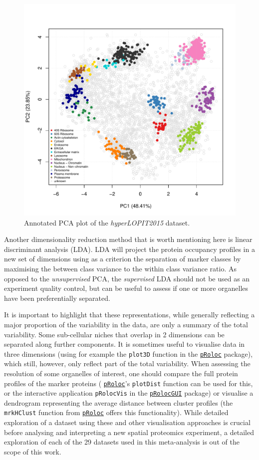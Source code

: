 \documentclass[12pt]{article}\usepackage[]{graphicx}\usepackage[]{color}
\newenvironment{knitrout}{}{} %
\newcommand{\Rpackage}[1]{\texttt{#1}}
\newcommand\Biocpkg[1]{%
  {\href{http://bioconductor.org/packages/#1}%
    {\Rpackage{#1}}}}
\begin{document}
\begin{figure}[ht]
  \centering
\begin{knitrout}
\color{fgcolor}
\includegraphics[width=0.75\linewidth]{figure/pcahl-1} 

\end{knitrout}
  \caption{Annotated PCA plot of the \textit{hyperLOPIT2015} dataset.}
  \label{fig:pcahl}
\end{figure}

Another dimensionality reduction method that is worth mentioning here
is linear discriminant analysis (LDA). LDA will project the protein
occupancy profiles in a new set of dimensions using as a criterion the
separation of marker classes by maximising the between class variance
to the within class variance ratio. As opposed to the
\textit{unsupervised} PCA, the \textit{supervised} LDA should not be
used as an experiment quality control, but can be useful to assess if
one or more organelles have been preferentially separated.

\bigskip

It is important to highlight that these representations, while
generally reflecting a major proportion of the variability in the
data, are only a summary of the total variability. Some sub-cellular
niches that overlap in 2 dimensions can be separated along further
components. It is sometimes useful to visualise data in three
dimensions (using for example the \texttt{plot3D} function in the
\Biocpkg{pRoloc} package), which still, however, only reflect part of
the total variability. When assessing the resolution of some
organelles of interest, one should compare the full protein profiles
of the marker proteins (\Biocpkg{pRoloc}'s \texttt{plotDist} function
can be used for this, or the interactive application
\texttt{pRolocVis} in the \Biocpkg{pRolocGUI} package) or visualise a
dendrogram representing the average distance between cluster profiles
(the \texttt{mrkHClust} function from \Biocpkg{pRoloc} offers this
functionality). While detailed exploration of a dataset using these
and other visualisation approaches is crucial before analysing and
interpreting a new spatial proteomics experiment, a detailed
exploration of each of the 29 datasets used in this
meta-analysis is out of the scope of this work.
\end{document}
